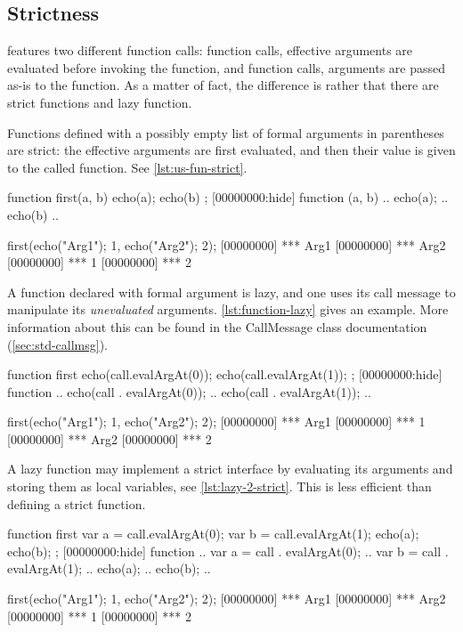 \subsection{Strictness}

\us features two different function calls:  function
calls, effective arguments are evaluated before invoking the function,
and  function calls, arguments are passed as-is to the
function.  As a matter of fact, the difference is rather that there
are strict functions and lazy function.

Functions defined with a possibly empty list of formal arguments in
parentheses are strict: the effective arguments are first evaluated,
and then their value is given to the called function.  See
\autoref{lst:us-fun-strict}.

\begin{urbiscript}[caption=Strict Functions,
  label=lst:us-fun-strict,float=\floatpos]
function first(a, b) {
  echo(a); echo(b)
};
[00000000:hide] function (a, b) {
..  echo(a);
..  echo(b)
..}

first({echo("Arg1"); 1},
      {echo("Arg2"); 2});
[00000000] *** Arg1
[00000000] *** Arg2
[00000000] *** 1
[00000000] *** 2
\end{urbiscript}

A function declared with formal argument is lazy, and one uses its
call message to manipulate its \emph{unevaluated} arguments.
\autoref{lst:function-lazy} gives an example.  More information about
this can be found in the CallMessage class documentation
(\autoref{sec:std-callmsg}).

\begin{urbiscript}[caption=Lazy
  function,label=lst:function-lazy,float=\floatposh]
function first
{
  echo(call.evalArgAt(0));
  echo(call.evalArgAt(1));
};
[00000000:hide] function {
..  echo(call . evalArgAt(0));
..  echo(call . evalArgAt(1));
..}

first({echo("Arg1"); 1},
      {echo("Arg2"); 2});
[00000000] *** Arg1
[00000000] *** 1
[00000000] *** Arg2
[00000000] *** 2
\end{urbiscript}

A lazy function may implement a strict interface by evaluating its
arguments and storing them as local variables, see
\autoref{lst:lazy-2-strict}.  This is less efficient than defining a
strict function.

\begin{urbiscript}[caption=Lazy functions with strict semantics,
  label=lst:lazy-2-strict,float=\floatposh]
function first
{
  var a = call.evalArgAt(0);
  var b = call.evalArgAt(1);
  echo(a); echo(b);
};
[00000000:hide] function {
..  var a = call . evalArgAt(0);
..  var b = call . evalArgAt(1);
..  echo(a);
..  echo(b);
..}

first({echo("Arg1"); 1},
      {echo("Arg2"); 2});
[00000000] *** Arg1
[00000000] *** Arg2
[00000000] *** 1
[00000000] *** 2
\end{urbiscript}

